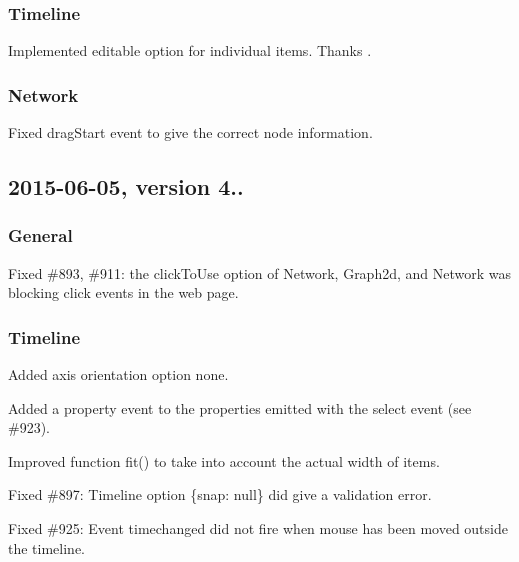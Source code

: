 \subsubsection*{Timeline}


\begin{DoxyItemize}
\item Implemented {\ttfamily editable} option for individual items. Thanks .
\end{DoxyItemize}

\subsubsection*{Network}


\begin{DoxyItemize}
\item Fixed drag\+Start event to give the correct node information.
\end{DoxyItemize}

\subsection*{2015-\/06-\/05, version 4..}

\subsubsection*{General}


\begin{DoxyItemize}
\item Fixed \#893, \#911\+: the {\ttfamily click\+To\+Use} option of Network, Graph2d, and Network was blocking click events in the web page.
\end{DoxyItemize}

\subsubsection*{Timeline}


\begin{DoxyItemize}
\item Added axis orientation option {\ttfamily \textquotesingle{}none\textquotesingle{}}.
\item Added a property {\ttfamily event} to the properties emitted with the {\ttfamily select} event (see \#923).
\item Improved function {\ttfamily fit()} to take into account the actual width of items.
\item Fixed \#897\+: Timeline option {\ttfamily \{snap\+: null\}} did give a validation error.
\item Fixed \#925\+: Event {\ttfamily timechanged} did not fire when mouse has been moved outside the timeline.
\end{DoxyItemize}

